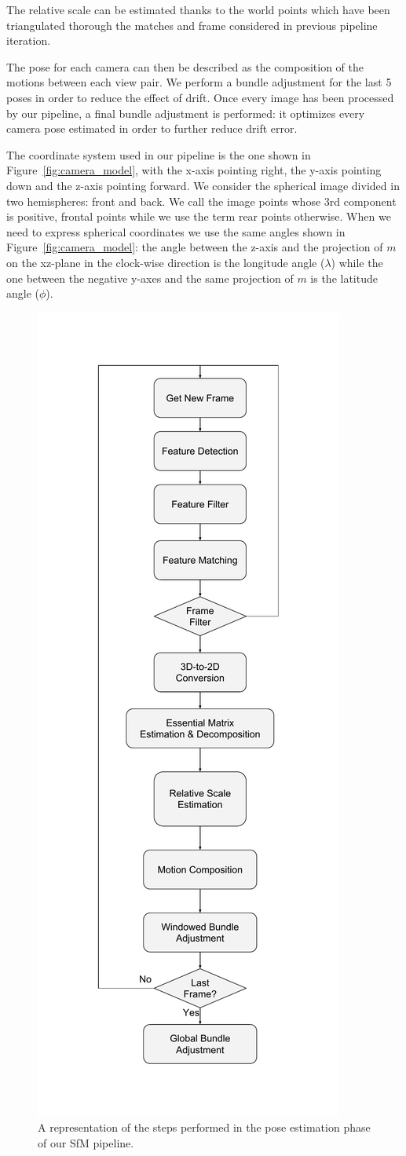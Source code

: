 The relative scale can be estimated thanks to the world points which have been 
triangulated thorough the matches and frame considered in previous pipeline 
iteration.

The pose for each camera can then be described as the composition of the 
motions between each view pair. We perform a bundle adjustment for the last 5 
poses in order to reduce the effect of drift.
Once every image has been processed by our pipeline, a final 
bundle adjustment is performed: it optimizes every camera pose estimated in order to 
further reduce drift error.

The coordinate system used in our pipeline is the one shown in 
Figure~\ref{fig:camera_model}, with the x-axis pointing right, the y-axis 
pointing down and the z-axis pointing forward.
We consider the spherical image divided in two hemispheres: front and back.
We call the image points 
whose 3rd component is positive, frontal points while we use the term rear 
points otherwise.
When we need to express spherical coordinates we use the same angles shown in 
Figure~\ref{fig:camera_model}:
the angle between the z-axis and the projection of $m$ on the xz-plane in 
the clock-wise direction is the longitude angle ($\lambda$) while the one 
between the negative y-axes and the same projection of $m$ is the latitude 
angle ($\phi$).

\begin{figure}
	\centering
	\includegraphics[width=0.5\linewidth]{img/sfm_block}
	\caption{A representation of the steps performed in the pose estimation 
	phase of our SfM pipeline.}
	\label{fig:sfm_block}
\end{figure}

